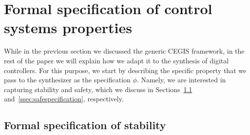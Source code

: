 \documentclass[twocolumn]{autart}    %
\begin{document}
\section{Formal specification of control systems properties} 
\label{sec:specification}

While in the previous section we discussed the generic CEGIS
framework, in the rest of the paper we will explain how we adapt it to
the synthesis of digital controllers. For this purpose, we start by
describing the specific property that we pass to the synthesizer as
the specification $\phi$. Namely, we are interested in capturing
stability and safety, which we discuss in Sections~\ref{ssec:stabspecification}
and~\ref{ssec:safespecification}, respectively.

\subsection{Formal specification of stability} 
\label{ssec:stabspecification}
\end{document}

